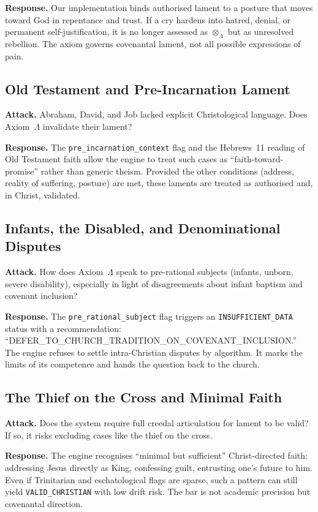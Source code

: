 \documentclass[11pt]{article}
\begin{document}
\textbf{Response.} Our implementation binds authorised lament to a posture that moves toward God in repentance and trust. If a cry hardens into hatred, denial, or permanent self-justification, it is no longer assessed as $\otimes_{\Lambda}$ but as unresolved rebellion. The axiom governs covenantal lament, not all possible expressions of pain.

\subsection{Old Testament and Pre-Incarnation Lament}

\textbf{Attack.} Abraham, David, and Job lacked explicit Christological language. Does Axiom~$\Lambda$ invalidate their lament?

\textbf{Response.} The \texttt{pre\_incarnation\_context} flag and the Hebrews~11 reading of Old Testament faith allow the engine to treat such cases as ``faith-toward-promise'' rather than generic theism. Provided the other conditions (address, reality of suffering, posture) are met, these laments are treated as authorised and, in Christ, validated.

\subsection{Infants, the Disabled, and Denominational Disputes}

\textbf{Attack.} How does Axiom~$\Lambda$ speak to pre-rational subjects (infants, unborn, severe disability), especially in light of disagreements about infant baptism and covenant inclusion?

\textbf{Response.} The \texttt{pre\_rational\_subject} flag triggers an \texttt{INSUFFICIENT\_DATA} status with a recommendation: ``DEFER\_TO\_CHURCH\_TRADITION\_ON\_COVENANT\_INCLUSION.'' The engine refuses to settle intra-Christian disputes by algorithm. It marks the limits of its competence and hands the question back to the church.

\subsection{The Thief on the Cross and Minimal Faith}

\textbf{Attack.} Does the system require full creedal articulation for lament to be valid? If so, it risks excluding cases like the thief on the cross.

\textbf{Response.} The engine recognises ``minimal but sufficient'' Christ-directed faith: addressing Jesus directly as King, confessing guilt, entrusting one's future to him. Even if Trinitarian and eschatological flags are sparse, such a pattern can still yield \texttt{VALID\_CHRISTIAN} with low drift risk. The bar is not academic precision but covenantal direction.
\end{document}
